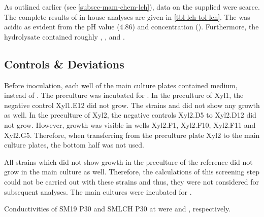 As outlined earlier (see \vref{subsec-mam-chem-lch}), data on the \lch{} supplied were scarce. The complete results of in-house analyses are given in \vref{tbl-lch-tol-lch}. The \lch{} was acidic as evident from the pH value (\num{4.86}) and \acet{} concentration (). Furthermore, the hydrolysate contained roughly  \glc{},  \xyl{},  \fur{} and  \hmf{}.

\subsection{Controls \& Deviations}
Before inoculation, each well of the main culture plates contained  medium, instead of . The preculture was incubated for . In the preculture of Xyl1, the negative control Xyl1.E12 did not grow. The strains  and  did not show any growth as well. In the preculture of Xyl2, the negative controls Xyl2.D5 to Xyl2.D12 did not grow. However, growth was visible in wells Xyl2.F1, Xyl2.F10, Xyl2.F11 and Xyl2.G5. Therefore, when transferring from the preculture plate Xyl2 to the main culture plates, the bottom half was not used.

All strains which did not show growth in the preculture of the reference did not grow in the main culture as well. Therefore, the calculations of this screening step could not be carried out with these strains and thus, they were not considered for subsequent analyses. The main cultures were incubated for .

Conductivities of SM19 P30 and SMLCH P30 at  were  and , respectively.

